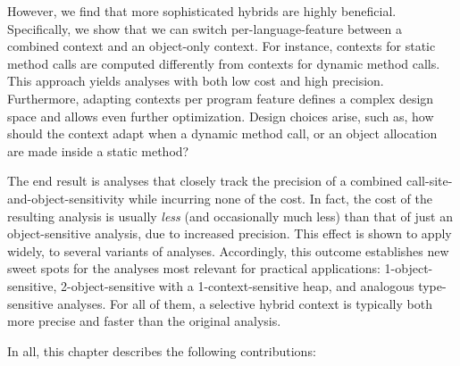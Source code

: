 However, we find that more sophisticated hybrids are highly beneficial. Specifically, we show that we can switch per-language-feature between a combined context and an object-only context. For instance, contexts for static method calls are computed differently from contexts for dynamic method calls. This approach yields analyses with both low cost and high precision. Furthermore, adapting contexts per program feature defines a complex design space and allows even further optimization. Design choices arise, such as, how should the context adapt when a dynamic method call, or an object allocation are made inside a static method?

The end result is analyses that closely track the precision of a combined call-site-and-object-sensitivity while incurring none of the cost. In fact, the cost of the resulting analysis is usually \emph{less} (and occasionally much less) than that of just an object-sensitive analysis, due to increased precision. This effect is shown to apply widely, to several variants of analyses. Accordingly, this outcome establishes new sweet spots for the analyses most relevant for practical applications: 1-object-sensitive, 2-object-sensitive with a 1-context-sensitive heap, and analogous type-sensitive \cite{popl:2011:Smaragdakis} analyses. For all of them, a selective hybrid context is typically both more precise and faster than the original analysis.

In all, this chapter describes the following contributions:

